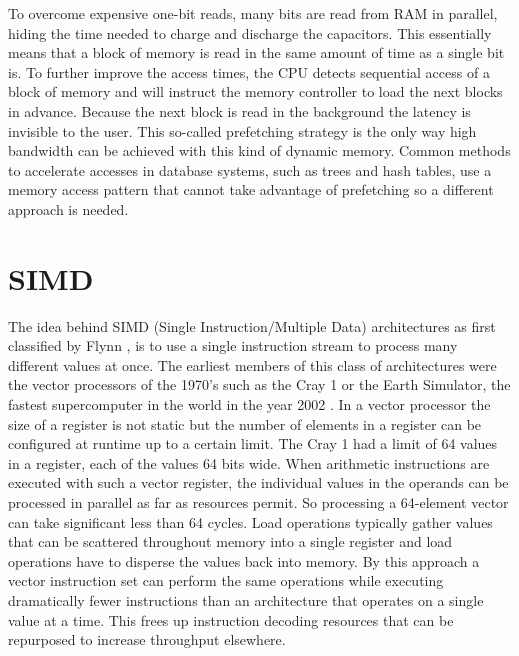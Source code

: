 To overcome expensive one-bit reads, many bits are read from RAM in parallel,
hiding the time needed to charge and discharge the capacitors. This essentially
means that a block of memory is read in the same amount of time as a single bit
is. To further improve the access times, the CPU detects sequential access of a
block of memory and will instruct the memory controller to load the next blocks
in advance. Because the next block is read in the background the latency is
invisible to the user. This so-called prefetching strategy is the only way high
bandwidth can be achieved with this kind of dynamic memory. Common methods to
accelerate accesses in database systems, such as trees and hash tables, use a
memory access pattern that cannot take advantage of prefetching so a different
approach is needed.

\section{SIMD}

The idea behind SIMD (Single Instruction/Multiple Data) architectures as
first classified by Flynn \cite{flynnsimd}, is to use a single instruction
stream to process many different values at once. The earliest members of this
class of architectures were the vector processors of the 1970's such as the
Cray 1 or the Earth Simulator, the fastest supercomputer in the world in the year
2002 \cite{hennessyarch}. In a vector processor the size of a register is not
static but the number of elements in a register can be configured at runtime up
to a certain limit. The Cray 1 had a limit of 64 values in a register, each of
the values 64 bits wide. When arithmetic instructions are executed with such a
vector register, the individual values in the operands can be processed in
parallel as far as resources permit. So processing a 64-element vector can take
significant less than 64 cycles. Load operations typically gather values that
can be scattered throughout memory into a single register and load operations
have to disperse the values back into memory. By this approach a vector
instruction set can perform the same operations while executing dramatically
fewer instructions than an architecture that operates on a single value at a
time. This frees up instruction decoding resources that can be repurposed to
increase throughput elsewhere.

